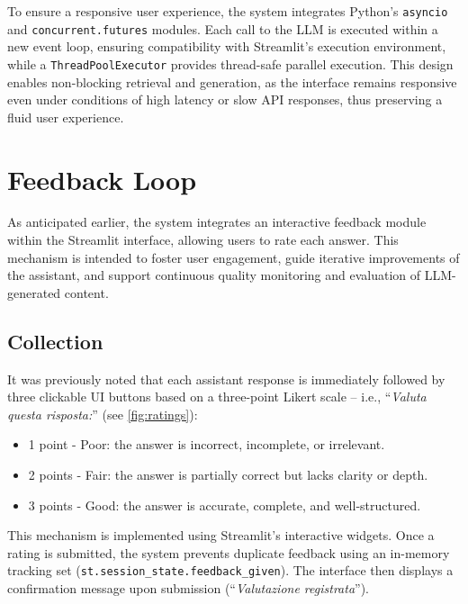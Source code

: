 \begin{spacing}{1.5}
To ensure a responsive user experience, the system integrates Python's \texttt{asyncio} and \texttt{concurrent.futures} modules. Each call to the LLM is executed within a new event loop, ensuring compatibility with Streamlit’s execution environment, while a \texttt{ThreadPoolExecutor} provides thread-safe parallel execution. This design enables non-blocking retrieval and generation, as the interface remains responsive even under conditions of high latency or slow API responses, thus preserving a fluid user experience.


\section{Feedback Loop}
As anticipated earlier, the system integrates an interactive feedback module within the Streamlit interface, allowing users to rate each answer. This mechanism is intended to foster user engagement, guide iterative improvements of the assistant, and support continuous quality monitoring and evaluation of LLM-generated content.

\subsection{Collection}
It was previously noted that each assistant response is immediately followed by three clickable UI buttons based on a three-point Likert scale -- i.e., ``\textit{Valuta questa risposta:}'' (see \autoref{fig:ratings}):
\begin{itemize}
\item 1 point - Poor: the answer is incorrect, incomplete, or irrelevant.
\item 2 points - Fair: the answer is partially correct but lacks clarity or depth.
\item 3 points - Good: the answer is accurate, complete, and well-structured.
\end{itemize}

This mechanism is implemented using Streamlit’s interactive widgets. Once a rating is submitted, the system prevents duplicate feedback using an in-memory tracking set (\texttt{st.session\_state.feedback\_given}). The interface then displays a confirmation message upon submission (``\textit{Valutazione registrata}'').


\end{spacing}
